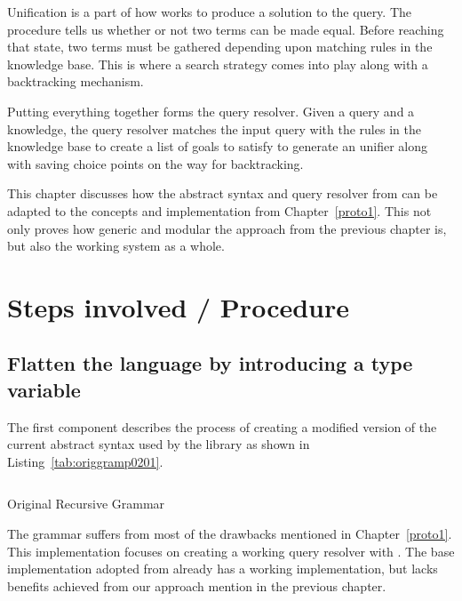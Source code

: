\documentclass[thesis-solanki.tex]{subfiles}
\begin{document}
Unification is a part of how  works to produce a solution to the query. The  procedure
tells us whether or not two terms can be made equal. Before reaching that state, two terms must be gathered depending 
upon matching rules in the knowledge base. This is where a search strategy comes into play along with a backtracking mechanism.

Putting everything together forms the  query resolver.
Given a query and a knowledge, the query resolver matches the input query with the rules in the knowledge base to
create a list of goals to satisfy to generate an unifier along with saving choice points on the way for
backtracking.

This chapter discusses how the abstract syntax and query resolver from \cite{prolog-lib} can be adapted to
the concepts and implementation from Chapter~\ref{proto1}.
This not only proves how generic and modular the approach from the previous chapter is, but also the working  system
as a whole.



\section{Steps involved / Procedure}


\subsection{Flatten the language by introducing a type variable}
The first component describes the process of creating a modified version of the current abstract syntax used by the library as shown in Listing~\ref{tab:origgramp0201}.

\begin{code-list}[H]
	\begin{singlespace}
	\inputminted[linenos]{haskell}{haskell-proto2-original-grammar.hs}
	\end{singlespace}
	\caption{Original Recursive Grammar}
\label{tab:origgramp0201}
\end{code-list}

The grammar suffers from most of the drawbacks mentioned in Chapter~\ref{proto1}. This implementation focuses on creating a working  
 query resolver with  . The base implementation 
adopted from  \cite{prolog-lib} already has a working implementation, but lacks benefits achieved from
our approach mention in the previous chapter.
\end{document}
